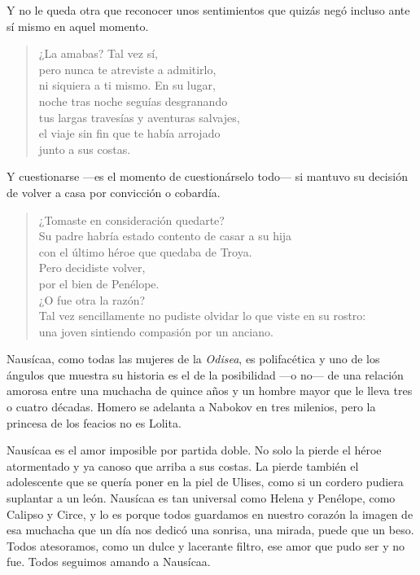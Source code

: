 \documentclass[11pt,a4paper]{article}
\begin{document}
Y no le queda otra que reconocer unos sentimientos que quizás negó incluso ante sí mismo en aquel momento.


\begin{verse}
¿La amabas? Tal vez sí,\\
pero nunca te atreviste a admitirlo,\\
ni siquiera a ti mismo. En su lugar,\\
noche tras noche seguías desgranando\\
tus largas travesías y aventuras salvajes,\\
el viaje sin fin que te había arrojado\\
junto a sus costas.
\end{verse}


Y cuestionarse ---es el momento de cuestionárselo todo--- si mantuvo su decisión de volver a casa por convicción o cobardía.

\begin{verse}
¿Tomaste en consideración quedarte?\\
Su padre habría estado contento de casar a su hija\\
con el último héroe que quedaba de Troya.\\
Pero decidiste volver,\\
por el bien de Penélope.\\
¿O fue otra la razón?\\
Tal vez sencillamente no pudiste olvidar lo que viste en su rostro:\\
una joven sintiendo compasión por un anciano.
\end{verse}

Nausícaa, como todas las mujeres de la \emph{Odisea}, es polifacética y uno de los ángulos que muestra su historia es el de la posibilidad ---o no--- de una relación amorosa entre una muchacha de quince años y un hombre mayor que le lleva tres o cuatro décadas. Homero se adelanta a Nabokov en tres milenios, pero la princesa de los feacios no es Lolita.

Nausícaa es el amor imposible por partida doble. No solo la pierde el héroe atormentado y ya canoso que arriba a sus costas. La pierde también el adolescente que se quería poner en la piel de Ulises, como si un cordero pudiera suplantar a un león. Nausícaa es tan universal como Helena y Penélope, como Calipso y Circe, y lo es porque todos guardamos en nuestro corazón la imagen de esa muchacha que un día nos dedicó una sonrisa, una mirada, puede que un beso. Todos atesoramos, como un dulce y lacerante filtro, ese amor que pudo ser y no fue. Todos seguimos amando a Nausícaa.
\end{document}
